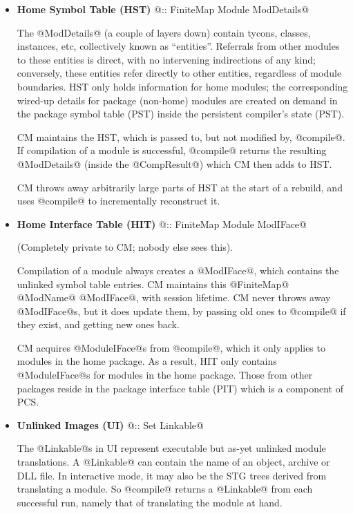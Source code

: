 \documentclass[11pt]{article}
\begin{document}
\begin{itemize}
\item
   {\bf Home Symbol Table (HST)} @:: FiniteMap Module ModDetails@

   The @ModDetails@ (a couple of layers down) contain tycons, classes,
   instances, etc, collectively known as ``entities''.  Referrals from
   other modules to these entities is direct, with no intervening
   indirections of any kind; conversely, these entities refer directly
   to other entities, regardless of module boundaries.  HST only holds
   information for home modules; the corresponding wired-up details
   for package (non-home) modules are created on demand in the package
   symbol table (PST) inside the persistent compiler's state (PST).

   CM maintains the HST, which is passed to, but not modified by,
   @compile@.  If compilation of a module is successful, @compile@
   returns the resulting @ModDetails@ (inside the @CompResult@) which
   CM then adds to HST.

   CM throws away arbitrarily large parts of HST at the start of a
   rebuild, and uses @compile@ to incrementally reconstruct it.

\item
   {\bf Home Interface Table (HIT)} @:: FiniteMap Module ModIFace@

   (Completely private to CM; nobody else sees this).

   Compilation of a module always creates a @ModIFace@, which contains
   the unlinked symbol table entries.  CM maintains this @FiniteMap@
   @ModName@ @ModIFace@, with session lifetime.  CM never throws away
   @ModIFace@s, but it does update them, by passing old ones to
   @compile@ if they exist, and getting new ones back.

   CM acquires @ModuleIFace@s from @compile@, which it only applies
   to modules in the home package.  As a result, HIT only contains
   @ModuleIFace@s for modules in the home package.  Those from other
   packages reside in the package interface table (PIT) which is a
   component of PCS.

\item
   {\bf Unlinked Images (UI)} @:: Set Linkable@

   The @Linkable@s in UI represent executable but as-yet unlinked
   module translations.  A @Linkable@ can contain the name of an
   object, archive or DLL file.  In interactive mode, it may also be
   the STG trees derived from translating a module.  So @compile@
   returns a @Linkable@ from each successful run, namely that of
   translating the module at hand.  


\end{itemize}
\end{document}
